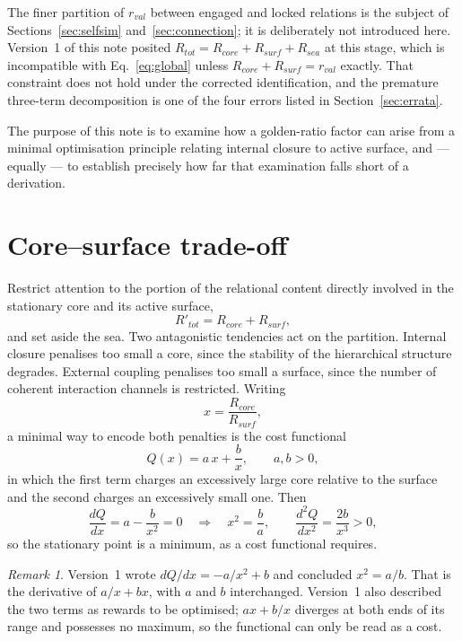\documentclass[11pt,a4paper]{article}
\def\mathrm#1{#1}%
\theoremstyle{definition}
\theoremstyle{plain}
\theoremstyle{remark}
\newtheorem{remark}{Remark}
\newcommand{\Rcore}{R_{\mathrm{core}}}
\newcommand{\Rsurf}{R_{\mathrm{surf}}}
\newcommand{\Rsea}{R_{\mathrm{sea}}}
\newcommand{\Rtot}{R_{\mathrm{tot}}}
\newcommand{\rval}{r_{\mathrm{val}}}
\begin{document}
The finer partition of $\rval$ between engaged and locked relations is the subject of Sections~\ref{sec:selfsim} and~\ref{sec:connection}; it is deliberately not introduced here. Version~1 of this note posited $\Rtot = \Rcore + \Rsurf + \Rsea$ at this stage, which is incompatible with Eq.~\eqref{eq:global} unless $\Rcore + \Rsurf = \rval$ exactly. That constraint does not hold under the corrected identification, and the premature three-term decomposition is one of the four errors listed in Section~\ref{sec:errata}.

The purpose of this note is to examine how a golden-ratio factor can arise from a minimal optimisation principle relating internal closure to active surface, and --- equally --- to establish precisely how far that examination falls short of a derivation.

\section{Core--surface trade-off}
\label{sec:tradeoff}

Restrict attention to the portion of the relational content directly involved in the stationary core and its active surface,
\[
R'_{\mathrm{tot}} = \Rcore + \Rsurf ,
\]
and set aside the sea. Two antagonistic tendencies act on the partition. Internal closure penalises too small a core, since the stability of the hierarchical structure degrades. External coupling penalises too small a surface, since the number of coherent interaction channels is restricted. Writing
\[
x = \frac{\Rcore}{\Rsurf},
\]
a minimal way to encode both penalties is the cost functional
\begin{equation}
Q(x) = a\,x + \frac{b}{x}, \qquad a,b > 0,
\label{eq:Q}
\end{equation}
in which the first term charges an excessively large core relative to the surface and the second charges an excessively small one. Then
\[
\frac{dQ}{dx} = a - \frac{b}{x^2} = 0
\quad\Longrightarrow\quad
x^2 = \frac{b}{a},
\qquad
\frac{d^2Q}{dx^2} = \frac{2b}{x^3} > 0 ,
\]
so the stationary point is a minimum, as a cost functional requires.

\begin{remark}
Version~1 wrote $dQ/dx = -a/x^2 + b$ and concluded $x^2 = a/b$. That is the derivative of $a/x + bx$, with $a$ and $b$ interchanged. Version~1 also described the two terms as rewards to be optimised; $ax + b/x$ diverges at both ends of its range and possesses no maximum, so the functional can only be read as a cost.
\end{remark}
\end{document}
